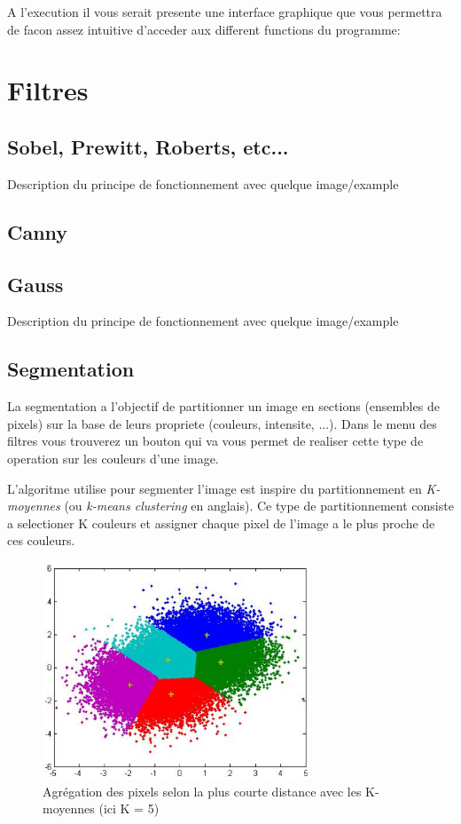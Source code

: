 \documentclass[twoside,openright,a4paper,11pt,french]{article}
\begin{document}
\vspace{1cm}
A l'execution il vous serait presente une interface graphique que vous
permettra de facon assez intuitive d'acceder aux different functions
du programme:

\begin{center}
\end{center}

\newpage 

\section{Filtres}
\label{sec:filtres}

\subsection{Sobel, Prewitt, Roberts, etc...}
Description du principe de fonctionnement avec quelque image/example

\subsection{Canny}

\subsection{Gauss}
Description du principe de fonctionnement avec quelque image/example

\subsection{Segmentation}
La segmentation a l'objectif de partitionner un image en sections
(ensembles de pixels) sur la base de leurs propriete (couleurs,
intensite, ...). Dans le menu des filtres vous trouverez un bouton qui
va vous permet de realiser cette type de operation sur les couleurs
d'une image. 

L'algoritme utilise pour segmenter l'image est inspire du
partitionnement en {\it K-moyennes} (ou {\it k-means clustering} en
anglais). Ce type de partitionnement consiste a selectioner K couleurs
et assigner chaque pixel de l'image a le plus proche de ces couleurs.

\begin{figure}[h]
\centering
\includegraphics[width=8cm]{./pics/kmeans.eps}
\caption{Agrégation des pixels selon la plus courte distance avec les
K-moyennes (ici K = 5)}
\label{fig:routcidr}
\end{figure}
\end{document}
